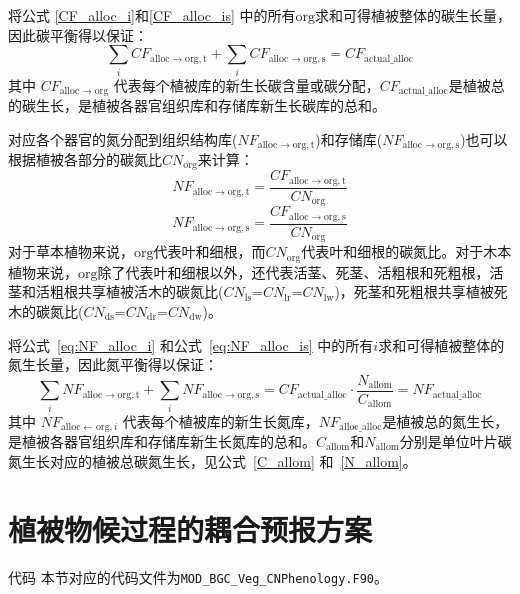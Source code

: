 将公式 \eqref{CF_alloc_i}和\eqref{CF_alloc_is} 中的所有${\mathrm {org}}$求和可得植被整体的碳生长量，因此碳平衡得以保证：
\begin{equation}
  \sum_{i}{CF_{\mathrm{alloc\rightarrow org,t}}}+\sum_{i}{CF_{\mathrm{alloc\rightarrow org,s}}}=CF_{\mathrm{actual\_alloc}}
\end{equation}
其中 $CF_{\mathrm{alloc\rightarrow org}}$ 代表每个植被库的新生长碳含量或碳分配，$CF_{\mathrm{actual\_alloc}}$是植被总的碳生长，是植被各器官组织库和存储库新生长碳库的总和。


对应各个器官的氮分配到组织结构库($NF_{\mathrm{alloc\rightarrow org,t}}$)和存储库($NF_{\mathrm{alloc\rightarrow org,s}}$)也可以根据植被各部分的碳氮比$CN_{\mathrm {org}}$来计算：
\begin{equation}\label{eq:NF_alloc_i}
  NF_{\mathrm{alloc\rightarrow org,t}} = \frac{CF_{\mathrm{alloc\rightarrow org,t}}}{CN_{\mathrm{org}}}
\end{equation}
\begin{equation}\label{eq:NF_alloc_is}
  NF_{\mathrm{alloc\rightarrow org,s}} = \frac{CF_{\mathrm{alloc\rightarrow org,s}}}{CN_{\mathrm{org}}}
\end{equation}
对于草本植物来说，${\mathrm {org}}$代表叶和细根，而$CN_{\mathrm{org}}$代表叶和细根的碳氮比。对于木本植物来说，${\mathrm {org}}$除了代表叶和细根以外，还代表活茎、死茎、活粗根和死粗根，活茎和活粗根共享植被活木的碳氮比($CN_{\mathrm{ls}}$=$CN_{\mathrm{lr}}$=$CN_{\mathrm{lw}}$)，死茎和死粗根共享植被死木的碳氮比($CN_{\mathrm{ds}}$=$CN_{\mathrm{dr}}$=$CN_{\mathrm{dw}}$)。


将公式~\eqref{eq:NF_alloc_i} 和公式~\eqref{eq:NF_alloc_is} 中的所有${i}$求和可得植被整体的氮生长量，因此氮平衡得以保证：
\begin{equation}
  \sum_{i}{NF_{\mathrm{alloc\rightarrow org,t}}}+\sum_{i}{NF_{\mathrm{alloc\rightarrow org,s}}}=CF_{\mathrm{actual\_alloc}}\cdot \frac{N_{\mathrm{allom}}}{C_{\mathrm{allom}}}=NF_{\mathrm{actual\_alloc}}
\end{equation}
其中 $NF_{\mathrm{alloc\gets org},i}$ 代表每个植被库的新生长氮库，$NF_{\mathrm{alloc\_alloc}}$是植被总的氮生长，是植被各器官组织库和存储库新生长氮库的总和。$C_{\mathrm{allom}}$和$N_{\mathrm{allom}}$分别是单位叶片碳氮生长对应的植被总碳氮生长，见公式~\eqref{C_allom} 和~\eqref{N_allom}。


\section{植被物候过程的耦合预报方案}\label{植被物候过程的耦合预报方案}
\begin{mymdframed}{代码}
  本节对应的代码文件为\texttt{MOD\_BGC\_Veg\_CNPhenology.F90}。
\end{mymdframed}


